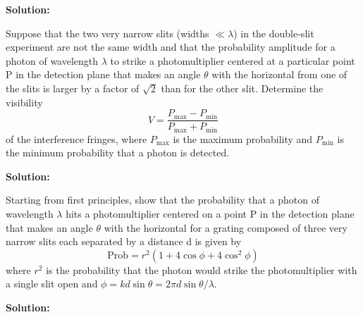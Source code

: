 \documentclass[11pt]{article}
\newcommand{\pn}[1]{\left( #1 \right)}
\begin{document}
\textbf{Solution:}\\

\clearpage

\begin{problem}[Townsend (P1.29) \P]
Suppose that the two very narrow slits (widths $\ll \lambda$) in the double-slit experiment are not the same
width and that the probability amplitude for a photon of wavelength $\lambda$ to strike a photomultiplier
centered at a particular point P in the detection plane that makes an angle $\theta$ with the horizontal
from one of the slits is larger by a factor of $\sqrt{2}$ than for the other slit. Determine the visibility
\[
	V = \frac{P_{\text{max}} - P_{\text{min}}}{P_{\text{max}} + P_{\text{min}}}
\]
of the interference fringes, where $P_{\text{max}}$ is the maximum probability and $P_{\text{min}}$ is the minimum probability that a photon is detected.
\end{problem}


\textbf{Solution:}\\

\clearpage

\begin{problem}[Townsend (P1.34) \P ]
Starting from first principles, show that the probability that a photon of wavelength $\lambda$ hits a
photomultiplier centered on a point P in the detection plane that makes an angle $\theta$ with the
horizontal for a grating composed of three very narrow slits each separated by a distance d is given
by
\[
	\text{Prob} = r^2\pn{1+4\cos\phi + 4\cos^2\phi}
\]	
where $r^2$ is the probability that the photon would strike the photomultiplier with a single slit open
and $\phi = kd\sin\theta = 2\pi d\sin\theta / \lambda$.
\end{problem}


\textbf{Solution:}\\

\clearpage
\end{document}
